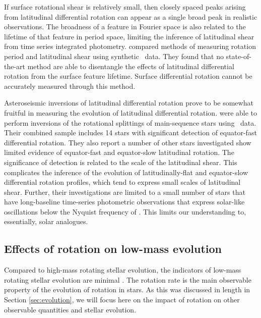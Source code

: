 If surface rotational shear is relatively small, then closely spaced peaks arising from latitudinal differential rotation can appear as a single broad peak in realistic observations.
The broadness of a feature in Fourier space is also related to the lifetime of that feature in period space, limiting the inference of latitudinal shear from time series integrated photometry.
\citet{aigrain_hare_2015} compared methods of measuring rotation period and latitudinal shear using synthetic \kepler\ data.
They found that no state-of-the-art method \citep[e.g., those adopted by ][]{reinhold_rotation_2013, mcquillan_rotation_2014, garcia_rotation_2014} are able to disentangle the effects of latitudinal differential rotation from the surface feature lifetime.
Surface differential rotation cannot be accurately measured through this method.

Asteroseismic inversions of latitudinal differential rotation prove to be somewhat fruitful in measuring the evolution of latitudinal differential rotation.
\citet{benomar_asteroseismic_2018, bazot_latitudinal_2019, hall_weakened_2021} were able to perform inversions of the rotational splittings of main-sequence stars using \kepler\ data.
Their combined sample includes 14 stars with significant detection of equator-fast differential rotation.
They also report a number of other stars investigated show limited evidence of equator-fast and equator-slow latitudinal rotation.
The significance of detection is related to the scale of the latitudinal shear.
This complicates the inference of the evolution of latitudinally-flat and equator-slow differential rotation profiles, which tend to express small scales of latitudinal shear.
Further, their investigations are limited to a small number of stars that have long-baseline time-series photometric observations that express solar-like oscillations below the Nyquist frequency of \kepler{}.
This limits our understanding to, essentially, solar analogues.


\subsection{Effects of rotation on low-mass evolution}
\label{sec:effects}

Compared to high-mass rotating stellar evolution, the indicators of low-mass rotating stellar evolution are minimal \citep[see, e.g.,][]{heger_presupernova_2000, maeder_evolution_2000}.
The rotation rate is the main observable property of the evolution of rotation in stars.
As this was discussed in length in Section \ref{sec:evolution}, we will focus here on the impact of rotation on other observable quantities and stellar evolution.

